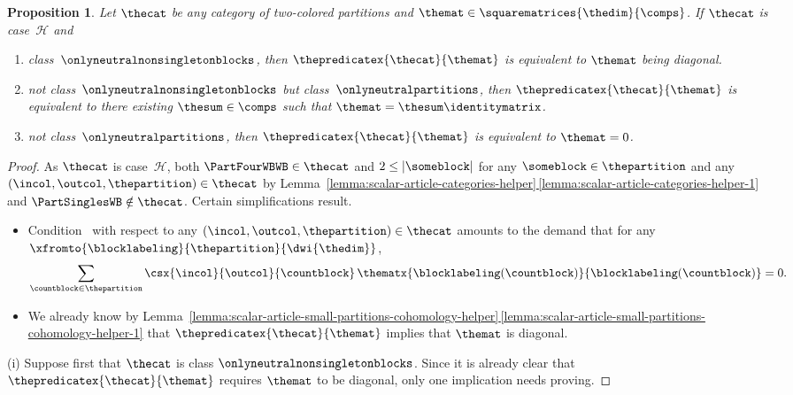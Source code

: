 \documentclass[pdftex]{sigma}
\numberwithin{equation}{section}
\newtheorem{Proposition}[Theorem]{Proposition}
{ \theoremstyle{definition}
\newtheorem{Definition}[Theorem]{Definition}
\newtheorem{Note}[Theorem]{Note}
\newtheorem{Example}[Theorem]{Example}
\newtheorem{Remark}[Theorem]{Remark}
\newtheorem{Notation}[Theorem]{Notation}
\newtheorem{Assumptions}[Theorem]{Assumptions}
}
\begin{document}
{\begin{Proposition}
  \label{proposition:final-case-h}
  Let $\thecat$ be any category of two-colored partitions and $\themat\in\squarematrices{\thedim}{\comps}$.
  If $\thecat$ is case~$\mathcal{H}$ and
    \begin{enumerate}[label=$(\roman*)$]
    \item\label{proposition:final-case-h-1}  class~$\onlyneutralnonsingletonblocks$, then $\thepredicatex{\thecat}{\themat}$ is equivalent to $\themat$ being diagonal.
    \item\label{proposition:final-case-h-2}  not class~$\onlyneutralnonsingletonblocks$ but  class~$\onlyneutralpartitions$, then $\thepredicatex{\thecat}{\themat}$ is equivalent to there existing $\thesum\in\comps$ such that $\themat=\thesum\identitymatrix$.
    \item\label{proposition:final-case-h-3}  not class~$\onlyneutralpartitions$, then $\thepredicatex{\thecat}{\themat}$ is equivalent to $\themat=0$.
  \end{enumerate}
\end{Proposition}
\begin{proof}
  As $\thecat$ is case~$\mathcal{H}$, both $\PartFourWBWB\in \thecat$ and $2\leq |\someblock|$ for any $\someblock\in\thepartition$ and any $(\incol,\outcol,\thepartition)\in\thecat$ by Lem\-ma~\hyperref[lemma:scalar-article-categories-helper-1]{\ref*{lemma:scalar-article-categories-helper}\,\ref*{lemma:scalar-article-categories-helper-1}} and $\PartSinglesWB\notin\thecat$. Certain simplifications result.
  \begin{itemize}
  \item Condition~\conditionone{} with respect to any $(\incol,\outcol,\thepartition)\in\thecat$ amounts to the demand  that for any ${\xfromto{\blocklabeling}{\thepartition}{\dwi{\thedim}}}$,
    \[
                \sum_{\countblock\in\thepartition}\csx{\incol}{\outcol}{\countblock}\,
        \thematx{\blocklabeling(\countblock)}{\blocklabeling(\countblock)}=0.
      \]
  \item We already know by Lem\-ma~\hyperref[lemma:scalar-article-small-partitions-cohomology-helper-1]{\ref*{lemma:scalar-article-small-partitions-cohomology-helper}\,\ref*{lemma:scalar-article-small-partitions-cohomology-helper-1}} that $\thepredicatex{\thecat}{\themat}$ implies that $\themat$ is  diagonal.
  \end{itemize}

  (i)
  Suppose first that $\thecat$ is class $\onlyneutralnonsingletonblocks$. Since it is already clear that $\thepredicatex{\thecat}{\themat}$ requires $\themat$ to be diagonal, only one implication needs proving.


\end{proof}}
\end{document}
